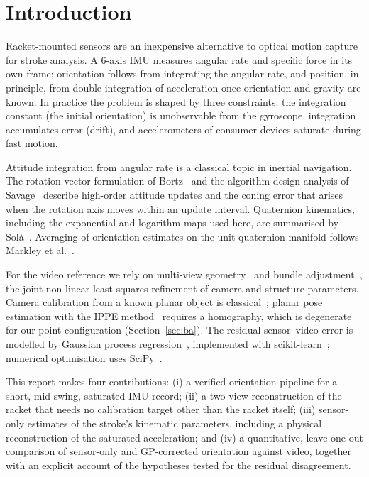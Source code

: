 \documentclass[11pt,a4paper]{article}
\begin{document}
\section{Introduction}
Racket-mounted sensors are an inexpensive alternative to optical motion capture for stroke
analysis. A 6-axis IMU measures angular rate and specific force in its own frame; orientation
follows from integrating the angular rate, and position, in principle, from double integration of
acceleration once orientation and gravity are known. In practice the problem is shaped by three
constraints: the integration constant (the initial orientation) is unobservable from the gyroscope,
integration accumulates error (drift), and accelerometers of consumer devices saturate during fast
motion.

Attitude integration from angular rate is a classical topic in inertial navigation. The rotation
vector formulation of Bortz~\cite{bortz1971} and the algorithm-design analysis of
Savage~\cite{savage1998} describe high-order attitude updates and the coning error that arises when
the rotation axis moves within an update interval. Quaternion kinematics, including the exponential
and logarithm maps used here, are summarised by Sol\`a~\cite{sola2017}. Averaging of orientation
estimates on the unit-quaternion manifold follows Markley et al.~\cite{markley2007}.

For the video reference we rely on multi-view geometry~\cite{hartley2004} and bundle
adjustment~\cite{triggs2000}, the joint non-linear least-squares refinement of camera and structure
parameters. Camera calibration from a known planar object is classical~\cite{zhang2000}; planar
pose estimation with the IPPE method~\cite{collins2014} requires a homography, which is degenerate
for our point configuration (Section~\ref{sec:ba}). The residual sensor--video error is modelled by
Gaussian process regression~\cite{rasmussen2006}, implemented with scikit-learn~\cite{sklearn2011};
numerical optimisation uses SciPy~\cite{scipy2020}.

This report makes four contributions: (i) a verified orientation pipeline for a short, mid-swing,
saturated IMU record; (ii) a two-view reconstruction of the racket that needs no calibration target
other than the racket itself; (iii) sensor-only estimates of the stroke's kinematic parameters,
including a physical reconstruction of the saturated acceleration; and (iv) a quantitative,
leave-one-out comparison of sensor-only and GP-corrected orientation against video, together with
an explicit account of the hypotheses tested for the residual disagreement.
\end{document}

